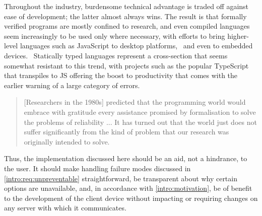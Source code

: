 Throughout the industry, burdensome technical advantage is traded off again\-st ease of development; the latter almost always wins. The result is that formally verified programs are mostly confined to research, and even compiled languages seem increasingly to be used only where necessary, with efforts to bring higher-level languages such as JavaScript to desktop platforms,~\cite{electron} and even to embedded devices.~\cite{jerryscript} Statically typed languages represent a cross-section that seems somewhat resistant to this trend, with projects such as the popular TypeScript~\cite{typescript} that transpiles to JS offering the boost to productivity that comes with the earlier warning of a large category of errors.

\begin{quote}
[Researchers in the 1980s] predicted that the programming world would embrace with gratitude every assistance promised by formalisation to solve the problems of reliability ... It has turned out that the world just does not suffer significantly from the kind of problem that our research was originally intended to solve.
\end{quote}

Thus, the implementation discussed here should be an aid, not a hindrance, to the user. It should make handling failure modes discussed in \cref{intro:req:unpreventable} straightforward, be transparent about why certain options are unavailable, and, in accordance with \cref{intro:motivation}, be of benefit to the development of the client device without impacting or requiring changes on any server with which it communicates.
